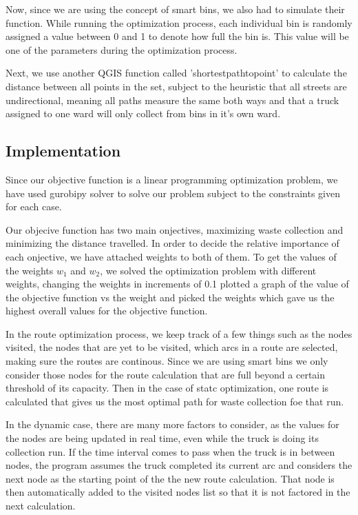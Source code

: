 \documentclass[12pt]{article}
\begin{document}
Now, since we are using the concept of smart bins, we also had to simulate their function. While running the optimization process, each individual bin is randomly assigned a value between 0 and 1 to denote how full the bin is. This value will be one of the parameters during the optimization process.

Next, we use another QGIS function called 'shortestpathtopoint' to calculate the distance between all points in the set, subject to the heuristic that all streets are undirectional, meaning all paths measure the same both ways and that a truck assigned to one ward will only collect from bins in it's own ward.

\subsection{Implementation}

Since our objective function is a linear programming optimization problem, we have used gurobipy solver to solve our problem subject to the constraints given for each case.

Our objecive function has two main onjectives, maximizing waste collection and minimizing the distance travelled. In order to decide the relative importance of each onjective, we have attached weights to both of them. To get the values of the weights $w_1$ and $w_2$, we solved the optimization problem with different weights, changing the weights in increments of 0.1 plotted a graph of the value of the objective function vs the weight and picked the weights which gave us the highest overall values for the objective function.       

In the route optimization process, we keep track of a few things such as the nodes visited, the nodes that are yet to be visited, which arcs in a route are selected, making sure the routes are continous. Since we are using smart bins we only consider those nodes for the route calculation that are full beyond a certain threshold of its capacity. Then in the case of statc optimization, one route is calculated that gives us the most optimal path for waste collection foe that run.

In the dynamic case, there are many more factors to consider, as the values for the nodes are being updated in real time, even while the truck is doing its collection run. If the time interval comes to pass when the truck is in between nodes, the program assumes the truck completed its current arc and considers the next node as the starting point of the the new route calculation. That node is then automatically added to the visited nodes list so that it is not factored in the next calculation.
\end{document}
